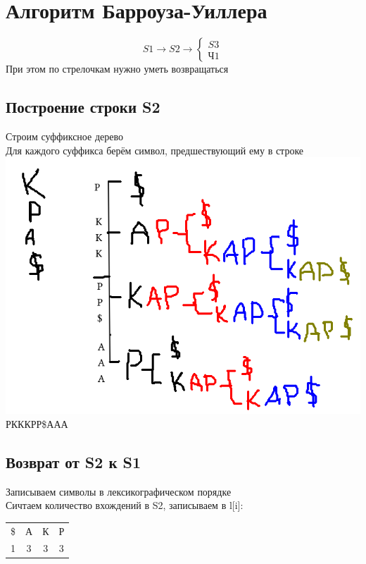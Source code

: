 \section{Алгоритм Барроуза-Уиллера}

$$ S1 \to S2 \to \begin{cases} S3 \\ \text{Ч}1 \end{cases} $$
При этом по стрелочкам нужно уметь возвращаться

\subsection{Построение строки S2}
Строим суффиксное дерево \\
Для каждого суффикса берём символ, предшествующий ему в строке \\
\includegraphics[scale=0.6]{3} \\
РКККРР\$ААА

\subsection{Возврат от S2 к S1}
Записываем символы в лексикографическом порядке \\
Сичтаем количество вхождений в S2, записываем в l[i]: \\
\begin{tabular}{c c c c}
 \$ & А & К & Р \\
 1 & 3 & 3 & 3
\end{tabular} \\ \ \\

